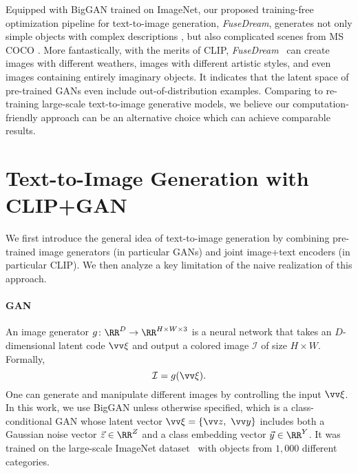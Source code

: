 \documentclass[10pt,twocolumn,letterpaper]{article}
\newcommand{\our}{\emph{FuseDream}}
\newcommand{\ganclip}{CLIP+GAN}
\begin{document}
\iffalse
First, for the optimization objective, we find that the original CLIP score cannot reflect the quality of images and thus propose \texttt{AugCLIP}, which averages the CLIP score of multiple augmented images, as the optimization objective.
Then, for the optimization process, we discuss the initialization, optimizer and injected noise to effectively maximize the proposed \texttt{AugCLIP} scores. 
Thirdly, to increase the capability of the generator to deal with the complicated composition of objects in the query text,
we fuse multiple generated images together. To better the naturalness and quality of images, we further formulate the optimization as a novel bi-level optimization problem \cite{solodov2007bundle, solodov2007bundle}.
We adopt a perceptual loss \cite{johnson2016perceptual} under the constraint that the $\texttt{AugCLIP}$ score is already optimal,
and effectively solve it with a barrier function gradient based algorithm.
\fi

Equipped with BigGAN trained on ImageNet, 
our proposed training-free optimization pipeline for text-to-image generation, \our, 
generates not only simple objects with complex descriptions
, but also complicated scenes from MS COCO \cite{lin2014microsoft}. More fantastically, with the merits of CLIP, \our~ can create images with different weathers, images with different artistic styles, and even images containing entirely imaginary objects.
It indicates that the latent space of pre-trained GANs even include out-of-distribution examples. 
Comparing to re-training large-scale text-to-image generative models, 
we believe our computation-friendly approach can be an alternative choice which can achieve comparable results. 
\fi  
\section{Text-to-Image Generation with \ganclip}
We first introduce the general idea of text-to-image generation 
by combining pre-trained image generators (in particular GANs)  
and joint image+text encoders (in particular CLIP).  
We then analyze a key limitation of 
 the naive realization of this approach. 


\paragraph{GAN} 
An image generator $g \colon \RR^D \to \RR^{H\times W \times 3} $ is a neural network that takes an $D$-dimensional latent code $\vv \xi$ and output a  colored image $\mathcal I$ of size $H\times W$. 
Formally, 
$$
\mathcal I = g(\vv \xi).  
$$
One can generate and manipulate different images by controlling the input $\vv \xi$. 
In this work, 
we use BigGAN \cite{brock2018large} 
unless otherwise specified, 
which is a class-conditional GAN whose latent vector $\vv \xi = \{\vv z, ~ \vv y\}$ includes both a Gaussian noise vector $\vec{z} \in \RR^Z$ 
and a class embedding vector $\vec{y} \in \RR^Y$.  
It was trained on the large-scale ImageNet dataset~\cite{russakovsky2015imagenet} with objects from $1,000$ different categories.  
\end{document}
